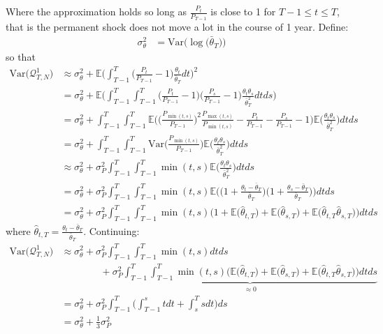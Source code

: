 Where the approximation holds so long as $\frac{P_{t}}{P_{T-1}}$ is close to 1 for $T-1 \leq t \leq T$, that is the permanent shock does not move a lot in the course of 1 year. Define:
\begin{align*}
\sigma^2_{\theta}&= \mathrm{Var}\Bigg(\log \Big(\bar{\theta}_T \Big) \Bigg)
\end{align*}
so that
\begin{align*}
\mathrm{Var}\big(\mathcal{Q}^1_{T,N}\big) &\approx \sigma^2_{\theta} + \mathbb{E} \Bigg(\int_{T-1}^{T} \Big(\frac{P_t}{P_{T-1}}-1\Big)\frac{\theta_t}{\bar{\theta}_T} dt \Bigg)^2 \\
&= \sigma^2_{\theta} + \mathbb{E} \Bigg(\int_{T-1}^{T} \int_{T-1}^{T} \Big(\frac{P_t}{P_{T-1}}-1\Big) \Big(\frac{P_s}{P_{T-1}}-1\Big) \frac{\theta_t \theta_s}{\bar{\theta}_T^2}  dt ds \Bigg) \\
&= \sigma^2_{\theta} +  \int_{T-1}^{T} \int_{T-1}^{T} \mathbb{E}\Bigg(\Big(\frac{P_{\min(t,s)}}{P_{T-1}}\Big)^2 \frac{P_{\max(t,s)}}{P_{\min(t,s)}}-\frac{P_t}{P_{T-1}}-\frac{P_s}{P_{T-1}}-1\Bigg) \mathbb{E} \Bigg( \frac{\theta_t \theta_s}{\bar{\theta}_T^2} \Bigg)  dt ds \\
&= \sigma^2_{\theta} +    \int_{T-1}^{T} \int_{T-1}^{T} \mathrm{Var}\Bigg(\frac{P_{\min(t,s)}}{P_{T-1}} \Bigg) \mathbb{E}\Bigg( \frac{\theta_t \theta_s}{\bar{\theta}_T^2} \Bigg) dt ds \\
&\approx \sigma^2_{\theta} +  \sigma^2_P\int_{T-1}^{T} \int_{T-1}^{T}  \min(t,s)  \mathbb{E} \Bigg( \frac{\theta_t \theta_s}{\bar{\theta}_T^2} \Bigg) dt ds \\
&= \sigma^2_{\theta} +  \sigma^2_P\int_{T-1}^{T} \int_{T-1}^{T}  \min(t,s)  \mathbb{E} \Bigg(\Big( 1 +\frac{\theta_t-\bar{\theta}_T}{\bar{\theta}_T} \Big) \Big( 1 +\frac{\theta_s-\bar{\theta}_T}{\bar{\theta}_T} \Big)\Bigg) dt ds \\
&= \sigma^2_{\theta} +  \sigma^2_P\int_{T-1}^{T} \int_{T-1}^{T}  \min(t,s)   \Bigg(1+\mathbb{E}\Big( \hat{\theta}_{t,T} \Big) +\mathbb{E} \Big( \hat{\theta}_{s,T} \Big) +\mathbb{E}\Big( \hat{\theta}_{t,T} \hat{\theta}_{s,T}\Big)\Bigg) dt ds
\end{align*}
where $\hat{\theta}_{t,T} = \frac{\theta_t-\bar{\theta}_T}{\bar{\theta}_T}$. Continuing:
\begin{align*}
\mathrm{Var}\big(\mathcal{Q}^1_{T,N}\big) 
&\approx \sigma^2_{\theta} +  \sigma^2_P\int_{T-1}^{T} \int_{T-1}^{T}  \min(t,s)    dt ds \\
& \qquad \qquad +\sigma^2_P \underbrace{\int_{T-1}^{T} \int_{T-1}^{T}  \min(t,s)   \Bigg(\mathbb{E}\Big( \hat{\theta}_{t,T} \Big) +\mathbb{E} \Big( \hat{\theta}_{s,T} \Big) +\mathbb{E}\Big( \hat{\theta}_{t,T} \hat{\theta}_{s,T}\Big)\Bigg) dt ds }_{\approx 0} \\
&= \sigma^2_{\theta} +  \sigma^2_P\int_{T-1}^{T} \Bigg( \int_{T-1}^{s}  t dt +  \int_{s}^{T}  s dt\Bigg) ds \\
&= \sigma^2_{\theta} +  \frac{1}{3}\sigma^2_P
\end{align*}
